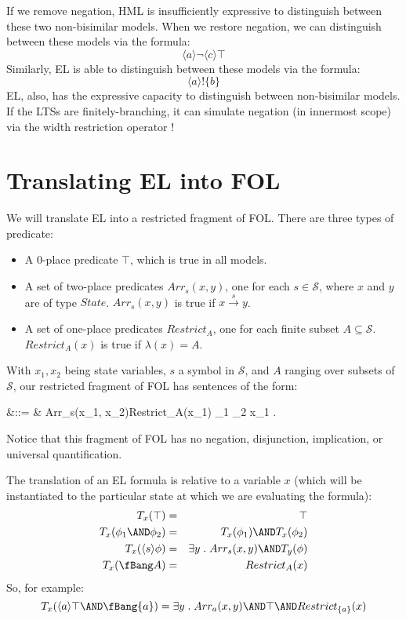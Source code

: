 If we remove negation, HML  is insufficiently expressive to distinguish between these two non-bisimilar models.
When we restore negation, we can distinguish between these models via the formula:
\[
\langle a \rangle \neg \langle c \rangle \top
\]
Similarly, EL is able to distinguish between these models via the formula:
\[
\langle a \rangle ! \{b\}
\]
EL, also, has the expressive capacity to distinguish between non-bisimilar models. If the LTSs are finitely-branching, it can simulate negation (in innermost scope) via the width restriction operator !

\section{Translating EL into FOL}

We will translate EL into a restricted fragment of FOL.
There are three types of predicate:
\begin{itemize}
\item
A 0-place predicate $\top$, which is true in all models.
\item
A set of two-place predicates $Arr_s(x, y)$, one for each $s \in \mathcal{S}$, where $x$ and $y$ are of type $State$. $Arr_s(x, y)$ is true if $x \xrightarrow{s} y$.
\item
A set of one-place predicates $Restrict_A$, one for each finite subset $A \subseteq \mathcal{S}$. 
$Restrict_{A}(x)$ is true if $\lambda(x) = A$.
\end{itemize}
With $x_1, x_2$ being state variables, $s$ a symbol in $\mathcal{S}$, and $A$ ranging over subsets of $\mathcal{S}$, our restricted fragment of FOL has sentences of the form:
\begin{GRAMMAR}
  \phi 
     &\quad ::= \quad&
  \top \fOr Arr_{s}(x_1, x_2)\fOr Restrict_A(x_1) \fOr \phi_1 \AND \phi_2 \fOr \exists x_1 . \phi 
\end{GRAMMAR}
Notice that this fragment of FOL has no negation, disjunction, implication, or universal quantification.

The translation of an EL formula is relative to a variable $x$ (which will be instantiated to the particular state at which we are evaluating the formula):
\begin{eqnarray}
T_x(\top) & = & \top \nonumber \\
T_x(\phi_1 \AND \phi_2) & = & T_x(\phi_1) \AND T_x(\phi_2) \nonumber \\
T_x(\langle s \rangle \phi) & = & \exists y \; . \; Arr_s(x,y) \AND T_y(\phi) \nonumber \\
T_x(\fBang A) & = & Restrict_A(x) \nonumber
\end{eqnarray}
So, for example:
\[
T_x(\langle a \rangle \top \AND \fBang \{a\}) = \exists y \; . \; Arr_a(x,y) \AND \top \AND Restrict_{\{a\}}(x)
\]

